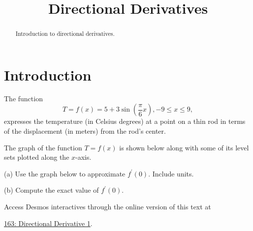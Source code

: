\documentclass{ximera}
\title{Directional Derivatives}
\begin{document}
\begin{abstract}
Introduction to directional derivatives.
\end{abstract}
\maketitle


\section{Introduction}


\begin{question}  \label{Qdsdfsddsf6bd}

The function
\[
   T = f(x) = 5 + 3\sin \left(   \frac{\pi}{6}x  \right)   , -9\leq x \leq 9 ,
\]
expresses the temperature (in Celsius degrees) at a point on a thin rod in terms of the displacement (in meters) from the rod's center.

The graph of the function $T=f(x)$ is shown below along with some of its level sets plotted along the $x$-axis.

(a) Use the graph below to approximate $f^\prime(0)$. Include units.

(b) Compute the exact value of $f^\prime(0)$.

 
\begin{onlineOnly}
    \begin{center}
\end{center}
\end{onlineOnly}

Access Desmos interactives through the online version of this text at
 
\href{https://www.desmos.com/calculator/1ztmnpaymf}{163: Directional Derivative 1}.



\end{question}
\end{document}
